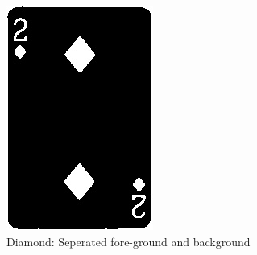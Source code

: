 \documentclass[conference]{IEEEtran}
\begin{document}
\begin{figure}[!htb]
  \centering
  \begin{minipage}[b]{0.45\textwidth}
    \includegraphics[width=\textwidth]{../programme/results/Task_3/diamond/image_0.jpg}
    \caption{Diamond: Seperated fore-ground and background}
    \label{Diamond: Seperated fore-ground and background}
  \end{minipage}
  \hfill
  \begin{minipage}[b]{0.45\textwidth}

\end{minipage}
\end{figure}
\end{document}
